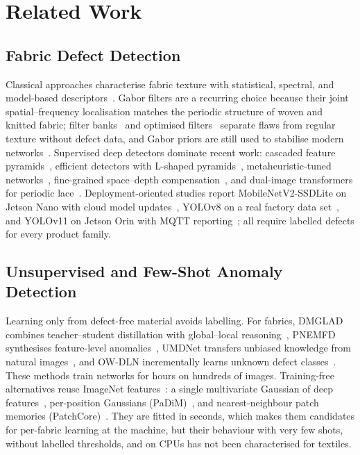 \section{Related Work}\label{sec:related}

\subsection{Fabric Defect Detection}
Classical approaches characterise fabric texture with statistical, spectral, and model-based descriptors~\cite{kumar2008survey}. Gabor filters are a recurring choice because their joint spatial--frequency localisation matches the periodic structure of woven and knitted fabric; filter banks~\cite{kumar2002gabor} and optimised filters~\cite{bodnarova2002optimal} separate flaws from regular texture without defect data, and Gabor priors are still used to stabilise modern networks~\cite{xu2023swin}. Supervised deep detectors dominate recent work: cascaded feature pyramids~\cite{wu2020cascaded}, efficient detectors with L-shaped pyramids~\cite{zhou2021edds}, metaheuristic-tuned networks~\cite{alruwais2023moth}, fine-grained space--depth compensation~\cite{zhou2025spacedepth}, and dual-image transformers for periodic lace~\cite{jiao2025lace}. Deployment-oriented studies report MobileNetV2-SSDLite on Jetson Nano with cloud model updates~\cite{zhang2022mobilenet}, YOLOv8 on a real factory data set~\cite{nasim2024realworld}, and YOLOv11 on Jetson Orin with MQTT reporting~\cite{machado2025textile}; all require labelled defects for every product family.

\subsection{Unsupervised and Few-Shot Anomaly Detection}
Learning only from defect-free material avoids labelling. For fabrics, DMGLAD combines teacher--student distillation with global--local reasoning~\cite{zhang2026dmglad}, PNEMFD synthesises feature-level anomalies~\cite{ma2025pnemfd}, UMDNet transfers unbiased knowledge from natural images~\cite{an2025causality}, and OW-DLN incrementally learns unknown defect classes~\cite{ye2026owdln}. These methods train networks for hours on hundreds of images. Training-free alternatives reuse ImageNet features~\cite{he2016resnet}: a single multivariate Gaussian of deep features~\cite{rippel2021gaussian}, per-position Gaussians (PaDiM)~\cite{defard2021padim}, and nearest-neighbour patch memories (PatchCore)~\cite{roth2022patchcore}. They are fitted in seconds, which makes them candidates for per-fabric learning at the machine, but their behaviour with very few shots, without labelled thresholds, and on CPUs has not been characterised for textiles.

